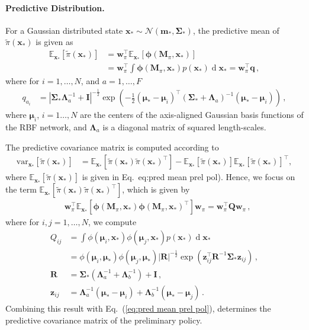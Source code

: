 \documentclass[a4paper, 11pt]{article}
\renewcommand{\vec}{\boldsymbol}
\newcommand{\mat}{\boldsymbol}
\newcommand{\E}{\mathds{E}}
\newcommand{\var}{\mathrm{var}}
\newcommand{\T}{^\top}
\newcommand{\inv}{^{-1}}
\newcommand{\prob}{{p}}
\renewcommand{\d}{\mathrm d}
\newcommand{\gauss}[2]{\mathcal N(#1,#2)}
\renewcommand{\d}{\operatorname{d}\!}
\begin{document}
\paragraph{Predictive Distribution.}
For a Gaussian distributed state $\vec x_*\sim\gauss{\vec
  m_*}{\mat\Sigma_*}$, the predictive mean of $\tilde\pi(\vec x_*)$ is
given as
%
\begin{align}
\E_{\vec x_*}[\tilde\pi(\vec x_*)] &= \vec w_\pi\T \E_{\vec
  x_*}[\vec\phi(\mat M_\pi, \vec x_*)]\\
&= \vec w_\pi\T\int \vec\phi(\mat M_\pi, \vec x_*)\prob(\vec
x_*)\d\vec x_* =\vec w_\pi\T\vec q\,,
\label{eq:pred mean prel pol}
\end{align}
where for $i=1,\dotsc,N$, and $a = 1,\dotsc, F$
\begin{align}
q_{a_i} &= |\mat\Sigma_*\mat\Lambda_a\inv + \mat
I|^{-\tfrac{1}{2}}\exp(-\tfrac{1}{2}(\vec\mu_*
-\vec\mu_i)\T(\mat\Sigma_* + \mat\Lambda_a)\inv(\vec\mu_*
-\vec\mu_i))\,,
\end{align}
where $\vec\mu_i$, $i=1\dotsc,N$ are the centers of the axis-aligned
Gaussian basis functions of the RBF network, and $\mat\Lambda_a$ is a
diagonal matrix of squared length-scales.

The predictive covariance matrix is computed according to
%
\begin{align*}
\var_{\vec x_*}[\tilde\pi(\vec x_*)]&\!=\!\E_{\vec x_*}[\tilde\pi(\vec
x_*)\tilde\pi(\vec x_*)\T]\! -\! \E_{\vec x_*}[\tilde\pi(\vec
x_*)]\E_{\vec x_*}[\tilde\pi(\vec
x_*)]\T,
\end{align*}
% 
where $\E_{\vec x_*}[\tilde\pi(\vec x_*)]$ is given in
Eq.~{eq:pred mean prel pol}). Hence, we focus on the term
$\E_{\vec x_*}[\tilde\pi(\vec x_*)\tilde\pi(\vec x_*)\T]$, which is given by
%
\begin{align*}
&\vec w_\pi\T\E_{\vec x_*}[\mat\phi(\mat M_\pi, \vec x_*)\mat\phi(\mat
M_\pi, \vec x_*)\T]\vec w_\pi=\vec w_\pi\T\mat Q\vec w_\pi\,,
\end{align*}
% 
where for $i,j = 1,\dotsc, N$, we compute
%
\begin{align*}
Q_{ij} &= \int\phi(\vec\mu_i, \vec x_*)\phi(\vec\mu_j, \vec
x_*)\prob(\vec x_*)\d\vec x_*\\
&=\phi(\vec\mu_i,\vec\mu_*)\phi(\vec\mu_j,\vec\mu_*)|\mat R|^{-\tfrac{1}{2}}\exp(\vec
z_{ij}\T\mat R\inv\mat\Sigma_*\vec z_{ij})\,,\\
\mat R &= \mat\Sigma_*(\mat\Lambda_a\inv + \mat\Lambda_b\inv) + \mat
I\,,\\
\vec z_{ij} &= \mat\Lambda_a\inv(\vec\mu_*-\vec\mu_i) +
\mat\Lambda_b\inv(\vec\mu_*-\vec\mu_j)\,.
\end{align*}
%
Combining this result with Eq.~(\ref{eq:pred mean prel pol}),
determines the predictive covariance matrix of the preliminary policy.
\end{document}
